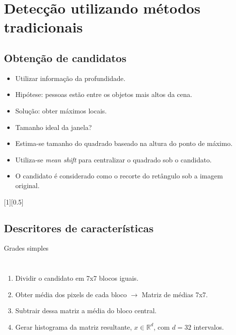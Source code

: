 \section{Detecção utilizando métodos tradicionais}

\subsection{Obtenção de candidatos}	
	\begin{frame}{\insertsubsection}	
		\begin{itemize}
		\item<only@1> Utilizar informação da profundidade.
		\item<only@2> Hipótese: pessoas estão entre os objetos mais altos da cena.
		\item<only@2> Solução: obter máximos locais.
		\item<only@3> Tamanho ideal da janela?
		\end{itemize}
	\end{frame}

	\begin{frame}{\insertsubsection}	
		\begin{itemize}
		\item Estima-se tamanho do quadrado baseado na altura do ponto de máximo. 
		\item Utiliza-se \emph{mean shift} para centralizar o quadrado sob o candidato.
		\item O candidato é considerado como o recorte do retângulo sob a imagem original.
		\end{itemize}
		[1][0.5]
	\end{frame}

\subsection{Descritores de características}
	\begin{frame}{Grades simples}
		\begin{columns}
		\begin{enumerate}
			\item Dividir o candidato em 7x7 blocos iguais. 
			\item Obter média dos pixels de cada bloco $\rightarrow$ Matriz de médias 7x7.
			\item Subtrair dessa matriz a média do bloco central.
			\item Gerar histograma da matriz resultante, $x \in \mathbb{R}^d$, com $d=32$ intervalos.
		\end{enumerate}
		\end{columns}
	\end{frame}

